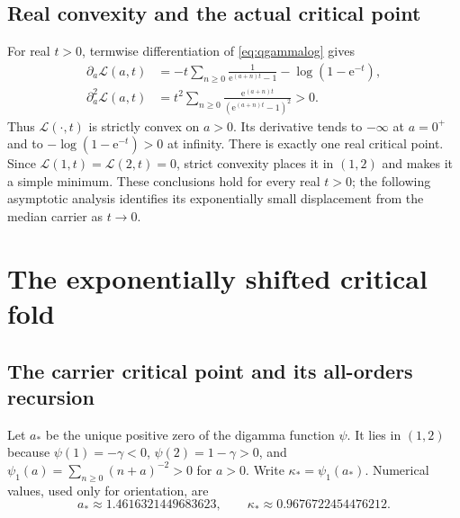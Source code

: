 \documentclass[11pt,a4paper]{article}
\numberwithin{equation}{section}
\theoremstyle{definition}
\theoremstyle{remark}
\newcommand{\e}{\mathrm e}
\newcommand{\cL}{\mathcal L}
\begin{document}
\subsection{Real convexity and the actual critical point}
For real $t>0$, termwise differentiation of
\eqref{eq:qgammalog} gives
\begin{align}
 \partial_a\cL(a,t)
  &=-t\sum_{n\geq0}\frac1{\e^{(a+n)t}-1}
                   -\log(1-\e^{-t}),\label{eq:digammaq}\\
 \partial_a^2\cL(a,t)
  &=t^2\sum_{n\geq0}
           \frac{\e^{(a+n)t}}{(\e^{(a+n)t}-1)^2}>0.
 \label{eq:convexityq}
\end{align}
Thus $\cL(\cdot,t)$ is strictly convex on $a>0$. Its derivative tends
to $-\infty$ at $a=0^+$ and to $-\log(1-\e^{-t})>0$ at infinity.
There is exactly one real critical point. Since
$\cL(1,t)=\cL(2,t)=0$, strict convexity places it in $(1,2)$ and makes
it a simple minimum. These conclusions hold for every real $t>0$;
the following asymptotic analysis identifies its exponentially small
displacement from the median carrier as $t\to0$.

\section{The exponentially shifted critical fold}
\label{sec:fold}

\subsection{The carrier critical point and its all-orders recursion}
Let $a_*$ be the unique positive zero of the digamma function $\psi$.
It lies in $(1,2)$ because $\psi(1)=-\gamma<0$,
$\psi(2)=1-\gamma>0$, and
$\psi_1(a)=\sum_{n\geq0}(n+a)^{-2}>0$ for $a>0$.
Write $\kappa_*=\psi_1(a_*)$. Numerical values, used only for
orientation, are
\begin{equation}
 a_*\approx1.4616321449683623,\qquad
 \kappa_*\approx0.9676722454476212.
 \label{eq:astar}
\end{equation}
\end{document}
